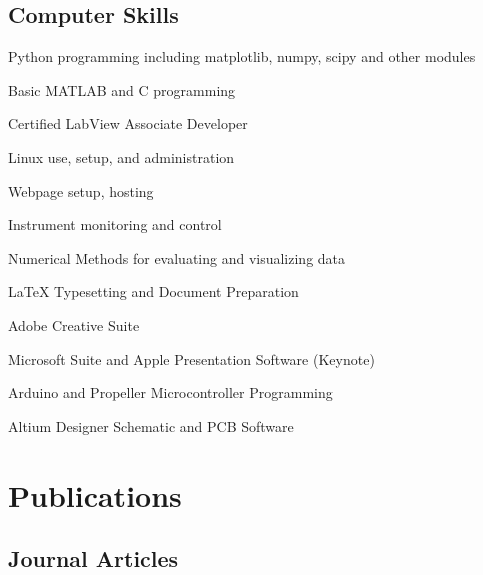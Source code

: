 \documentclass[letterpaper]{article}
\renewenvironment{itemize}{
  \begin{list}{}{
    \setlength{\leftmargin}{1.5em}
  }
}{
  \end{list}
}
\begin{document}
\subsection*{Computer Skills}

\begin{itemize}
\item Python programming including matplotlib, numpy, scipy and other modules 
\item Basic MATLAB and C programming
\item Certified LabView Associate Developer
\item Linux use, setup, and administration
\item Webpage setup, hosting
\item Instrument monitoring and control
\item Numerical Methods for evaluating and visualizing data
\item \LaTeX{} Typesetting and Document Preparation
\item Adobe Creative Suite
\item Microsoft Suite and Apple Presentation Software (Keynote)
\item Arduino and Propeller Microcontroller Programming
\item Altium Designer Schematic and PCB Software
\end{itemize}



\section*{Publications}

\subsection*{Journal Articles}
\end{document}
